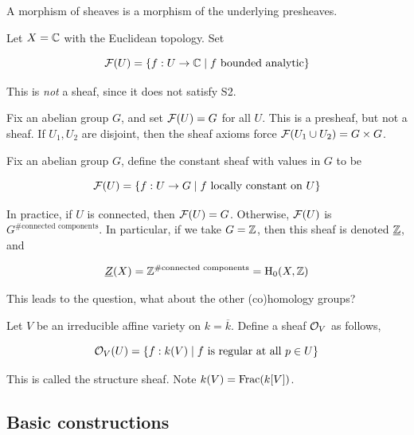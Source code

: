 \documentclass{article}
\begin{document}
\begin{definition}
    A morphism of sheaves is a morphism of the underlying presheaves.
\end{definition}

\begin{example}

    Let \(X = \mathbb{C}\) with the Euclidean topology. Set

    \[\mathcal{F}(U) = \left\{f : U \to \mathbb{C} \mid f\text{ bounded analytic}\right\}\]

    This is \emph{not} a sheaf, since it does not satisfy S2.
\end{example}

\begin{example}

    Fix an abelian group \(G\), and set \(\mathcal{F}(U) = G\) for all \(U\). This is a presheaf, but not a sheaf. If \(U_1, U_2\) are disjoint, then the sheaf axioms force \(\mathcal{F}(U_1 \cup U_2) = G \times G\).
\end{example}

\lec

\begin{example}
     Fix an abelian group \(G\), define the constant sheaf with values in \(G\) to be 

    \[\mathcal{F}(U) = \left\{f : U \to G \mid f \text{ locally constant on }U\right\}\]

    In practice, if \(U\) is connected, then \(\mathcal{F}(U) = G\). Otherwise, \(\mathcal{F}(U)\) is \(G^{\#\text{connected components}}\). In particular, if we take \(G = \mathbb{Z}\), then this sheaf is denoted \(\underline{\mathbb{Z}}\), and

    \[\underline{Z}(X) = \mathbb{Z}^{\#\text{connected components}} = \mathrm{H}_0(X, \mathbb{Z})\]

    This leads to the question, what about the other (co)homology groups?
\end{example}

\begin{example}
    Let \(V\) be an irreducible affine variety on \(k = \overline k\). Define a sheaf \(\mathcal{O}_V\) as follows,

    \[\mathcal{O}_V(U) = \left\{f : k(V) \mid f \text{ is regular at all }p \in U\right\}\]

    This is called the structure sheaf. Note \(k(V) = \operatorname{Frac}(k[V])\).
\end{example}

\subsection{Basic constructions}
\end{document}
